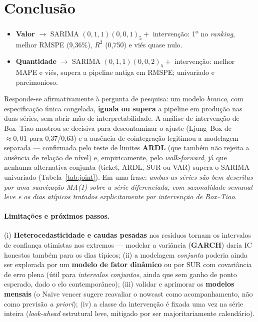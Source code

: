 \documentclass[11pt,a4paper]{article}
\begin{document}
\section{Conclusão}
\label{sec:conc}

\begin{itemize}\setlength\itemsep{2pt}
\item \textbf{Valor} $\to$ SARIMA $(0,1,1)(0,0,1)_5 +$ intervenção: 1\textsuperscript{o} no
\emph{ranking}, melhor RMSPE (9,36\%), $R^2$ (0,750) e viés quase nulo.
\item \textbf{Quantidade} $\to$ SARIMA $(0,1,1)(0,0,2)_5 +$ intervenção: melhor MAPE e viés,
supera a pipeline antiga em RMSPE; univariado e parcimonioso.
\end{itemize}

\noindent
Responde-se afirmativamente à pergunta de pesquisa: um modelo \emph{branco}, com especificação
única congelada, \textbf{iguala ou supera} a pipeline em produção nas duas séries, sem abrir mão de
interpretabilidade. A análise de intervenção de Box--Tiao mostrou-se decisiva para descontaminar o
ajuste (Ljung--Box de $\approx 0{,}01$ para 0,37/0,63) e a ausência de cointegração legitimou a
modelagem separada --- confirmada pelo teste de limites \textbf{ARDL} (que também não rejeita a
ausência de relação de nível) e, empiricamente, pelo \emph{walk-forward}, já que nenhuma alternativa
conjunta (ticket, ARDL, SUR ou VAR) supera o SARIMA univariado (Tabela~\ref{tab:joint}). Em uma
frase: \emph{ambas as séries são bem descritas por uma suavização MA(1) sobre a série diferenciada,
com sazonalidade semanal leve e os dias atípicos tratados explicitamente por intervenção de
Box--Tiao}.

\paragraph{Limitações e próximos passos.} (i) \textbf{Heterocedasticidade e caudas pesadas} nos
resíduos tornam os intervalos de confiança otimistas nos extremos --- modelar a variância
(\textbf{GARCH}) daria IC honestos também para os dias típicos; (ii) a modelagem \emph{conjunta}
poderia ainda ser explorada por um \textbf{modelo de fator dinâmico} ou por SUR com covariância de
erro plena (útil para \emph{intervalos conjuntos}, ainda que sem ganho de ponto esperado, dado o elo
contemporâneo); (iii) validar e aprimorar os \textbf{modelos mensais} (o Naive vencer sugere reavaliar o nowcast
como acompanhamento, não como previsão \emph{a priori}); (iv) a classe da intervenção é fixada uma
vez na série inteira (\emph{look-ahead} estrutural leve, mitigado por ser majoritariamente
calendário).
\end{document}
